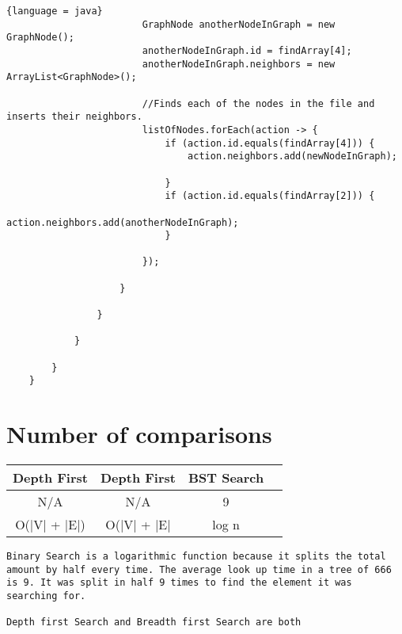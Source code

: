 \documentclass{article}
\begin{document}
\begin{lstlisting}{language = java}
                        GraphNode anotherNodeInGraph = new GraphNode();
                        anotherNodeInGraph.id = findArray[4];
                        anotherNodeInGraph.neighbors = new ArrayList<GraphNode>();

                        //Finds each of the nodes in the file and inserts their neighbors.
                        listOfNodes.forEach(action -> {
                            if (action.id.equals(findArray[4])) {
                                action.neighbors.add(newNodeInGraph);

                            }
                            if (action.id.equals(findArray[2])) {
                                action.neighbors.add(anotherNodeInGraph);
                            }

                        });

                    }

                }

            }

        }
    }
\end{lstlisting}
\section{Number of comparisons}
\begin{center}
\begin{tabular}{||c c c c||} 
 \hline
Depth First & Depth First & BST Search\\[0.5ex] 
 \hline\hline
N/A & N/A & 9 \\ 
 \hline
 O(|V| + |E|) & O(|V| + |E| & log n  \\
 \hline
\end{tabular}
\end{center}
\begin{lstlisting}
Binary Search is a logarithmic function because it splits the total amount by half every time. The average look up time in a tree of 666 is 9. It was split in half 9 times to find the element it was searching for.

Depth first Search and Breadth first Search are both 
\end{lstlisting}
\end{document}
